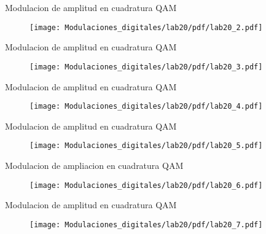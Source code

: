 \begin{frame}{Modulacion de amplitud en cuadratura QAM}
\begin{figure}[H]
\centering
\texttt{[image: Modulaciones\_digitales/lab20/pdf/lab20\_2.pdf]}
\end{figure}
\end{frame}


\begin{frame}{Modulacion de amplitud en cuadratura QAM}
\begin{figure}[H]
\centering
\texttt{[image: Modulaciones\_digitales/lab20/pdf/lab20\_3.pdf]}
\end{figure}
\end{frame}

\begin{frame}{Modulacion de amplitud en cuadratura QAM}
\begin{figure}[H]
\centering
\texttt{[image: Modulaciones\_digitales/lab20/pdf/lab20\_4.pdf]}
\end{figure}
\end{frame}


\begin{frame}{Modulacion de amplitud en cuadratura QAM}
\begin{figure}[H]
\centering
\texttt{[image: Modulaciones\_digitales/lab20/pdf/lab20\_5.pdf]}
\end{figure}
\end{frame}


\begin{frame}{Modulacion de ampliacion en cuadratura QAM}
\begin{figure}[H]
\centering
\texttt{[image: Modulaciones\_digitales/lab20/pdf/lab20\_6.pdf]}
\end{figure}
\end{frame}


\begin{frame}{Modulacion de amplitud en cuadratura QAM}
\begin{figure}[H]
\centering
\texttt{[image: Modulaciones\_digitales/lab20/pdf/lab20\_7.pdf]}
\end{figure}
\end{frame}



